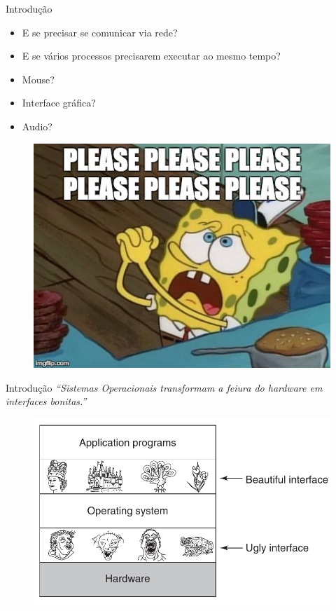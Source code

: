 \documentclass{beamer}
\begin{document}
\begin{frame}{Introdução}
	\begin{itemize}
		\item E se precisar se comunicar via rede?
		\item E se vários processos precisarem executar ao mesmo tempo?
		\item Mouse?
		\item Interface gráfica?
		\item Audio?
	\end{itemize}
	\pause
	\begin{figure}
		\includegraphics[width=0.4\paperwidth]{resources/please}
	\end{figure}
\end{frame}
\begin{frame}{Introdução}
	\textit{``Sistemas Operacionais transformam a feiura do hardware em interfaces bonitas.''}
	\begin{figure}
		\includegraphics[width=0.6\paperwidth]{resources/ugly}
	\end{figure}
\end{frame}
\end{document}
